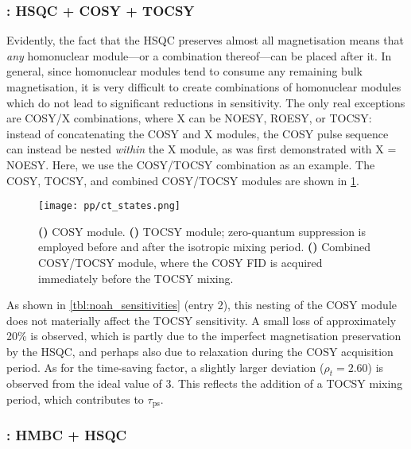 \subsubsection{: HSQC + COSY + TOCSY}

Evidently, the fact that the HSQC preserves almost all  magnetisation means that \textit{any} homonuclear module---or a combination thereof---can be placed after it.
In general, since homonuclear modules tend to consume any remaining bulk magnetisation, it is very difficult to create combinations of homonuclear modules which do not lead to significant reductions in sensitivity.
The only real exceptions are COSY/X combinations, where X can be NOESY, ROESY, or TOCSY: instead of concatenating the COSY and X modules, the COSY pulse sequence can instead be nested \textit{within} the X module, as was first demonstrated with X = NOESY\autocite{Haasnoot1984JMR,Gurevich1984JMR}.
Here, we use the COSY/TOCSY combination as an example.\autocite{Nolis2019MRC}
The COSY, TOCSY, and combined COSY/TOCSY modules are shown in \cref{fig:ct_states}.

\begin{figure}[!ht]
    \centering
    \texttt{[image: pp/ct\_states.png]}%
    {\label{fig:ct_states_c}}%
    {\label{fig:ct_states_t}}%
    {\label{fig:ct_states_ct}}%
    \caption[COSY/TOCSY NOAH module]{
        \textbf{()} COSY module.
        \textbf{()} TOCSY module; zero-quantum suppression is employed before and after the isotropic mixing period.
        \textbf{()} Combined COSY/TOCSY module, where the COSY FID is acquired immediately before the TOCSY mixing.
    }
    \label{fig:ct_states}
\end{figure}

As shown in \cref{tbl:noah_sensitivities} (entry 2), this nesting of the COSY module does not materially affect the TOCSY sensitivity.
A small loss of approximately 20\% is observed, which is partly due to the imperfect magnetisation preservation by the HSQC, and perhaps also due to relaxation during the COSY acquisition period.
As for the time-saving factor, a slightly larger deviation ($\rho_t = 2.60$) is observed from the ideal value of $3$.
This reflects the addition of a TOCSY mixing period, which contributes to $\tau_\text{ps}$.

\subsubsection{: HMBC + HSQC}

